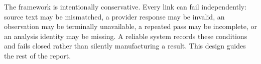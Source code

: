 The framework is intentionally conservative. Every link can fail independently: source text may be mismatched, a provider response may be invalid, an observation may be terminally unavailable, a repeated pass may be incomplete, or an analysis identity may be missing. A reliable system records these conditions and fails closed rather than silently manufacturing a result. This design guides the rest of the report.

